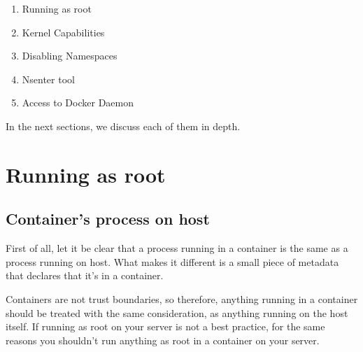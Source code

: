 \begin{enumerate}
\item Running as root
\item Kernel Capabilities
\item Disabling Namespaces
\item Nsenter tool
\item Access to Docker Daemon
\end{enumerate}

In the next sections, we discuss each of them in depth.

\section{Running as root}
\subsection{Container's process on host}
First of all, let it be clear that a process running in a container is the same as a process running on host. What makes it different is a small piece of metadata that declares that it's in a container. \cite{runningroot}

Containers are not trust boundaries, so therefore, anything running in a container should be treated with the same consideration, as anything running on the host itself.
If running as root on your server is not a best practice, for the same reasons you shouldn't run anything as root in a container on your server.
